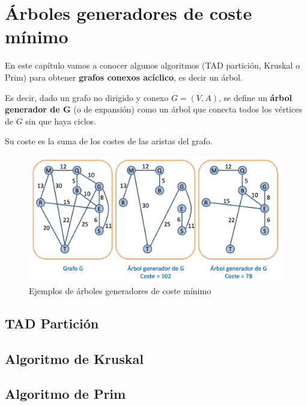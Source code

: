 \chapter{Árboles generadores de coste mínimo}
En este capítulo vamos a conocer algunos algoritmos (TAD partición, Kruskal o Prim) para obtener \textbf{grafos conexos acíclico}, es decir un árbol.

Es decir, dado un grafo no dirigido y conexo \(G = (V,A)\), se define un \textbf{árbol generador de G} (o de expansión) como un árbol que conecta todos los vértices de \(G\) sin que haya ciclos.

Su coste es la suma de los costes de las aristas del grafo.
\begin{figure}[h]
  \begin{center}
    \includegraphics[width=.7\textwidth]{assets/AGCM.png}
  \end{center}
  \caption{Ejemplos de árboles generadores de coste mínimo}
\end{figure}

\section{TAD Partición}

\section{Algoritmo de Kruskal}

\section{Algoritmo de Prim}

